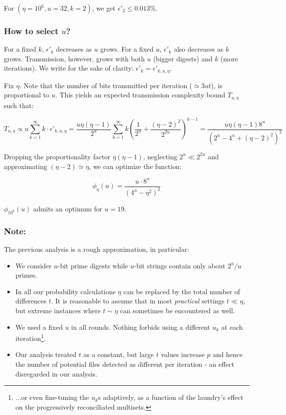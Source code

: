 \documentclass[11pt]{llncs}
\begin{document}
For $(\eta=10^6,u=32,k=2)$, we get $\epsilon'_2 \le 0.013\%$.\smallskip

\subsubsection{How to select $u$?}
% 
For a fixed $k$, $\epsilon'_k$ decreases as $u$ grows. For a fixed $u$, $\epsilon'_k$ also decreases as $k$ grows. Transmission, however, grows with both $u$ (bigger digests) and $k$ (more iterations). We write for the sake of clarity: $\epsilon'_k = \epsilon'_{k,u,\eta}$.\smallskip

Fix $\eta$. Note that the number of bits transmitted per iteration ($\simeq 3ut$), is proportional to $u$. This yields an expected transmission complexity bound $T_{u,\eta}$ such that:\smallskip

\[T_{u,\eta} \propto u \sum_{k=1}^{\infty} k \cdot \epsilon'_{k,u,\eta}=
\frac{u \eta\left(\eta-1\right)}{2^u} \sum_{k=1}^{\infty} k \left( \frac{1}{2^u} + \frac{\left(\eta-2\right)^2}{2^{2u}} \right)^{k-1}=
\frac{u \eta\left(\eta-1\right) 8^u}{\left(2^u-4^u+\left(\eta-2\right)^2\right)^2}\]

Dropping the proportionality factor $\eta\left(\eta-1\right)$, neglecting $2^u \ll 2^{2u}$ and approximating $(\eta-2)\simeq\eta$, we can optimize the function:

\[
\phi_\eta(u)=\frac{u \cdot 8^u}{\left(4^u-\eta^2\right)^2}
\]

$\phi_{10^6}(u)$ admits an optimum for $u=19$.

\subsubsection{Note:} The previous analysis is a rough approximation, in particular:

\begin{itemize}
\item We consider $u$-bit prime digests while $u$-bit strings contain only about $2^u/u$ primes.\smallskip

\item In all our probability calculations $\eta$ can be replaced by the total number of differences $t$. It is reasonable to assume that in most {\sl practical} settings $t \ll \eta$, but extreme instances where $t\sim\eta$ can sometimes be encountered as well.\smallskip

\item We used a fixed $u$ in all rounds. Nothing forbids using a different $u_k$ at each iteration\footnote{...or even fine-tuning the $u_k$s adaptively, as a function of the laundry's effect on the progressively reconciliated multisets.}.

\item Our analysis treated $t$ as a constant, but large $t$ values increase $p$ and hence the number of potential files detected as different per iteration - an effect disregarded in our analysis.
\end{itemize}
\end{document}
